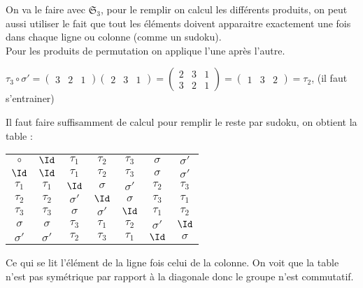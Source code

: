 \begin{ex}
On va le faire avec $\mathfrak{S}_3$, pour le remplir on calcul les différents produits, on peut aussi utiliser le fait que tout les éléments doivent apparaitre exactement une fois dans chaque ligne ou colonne (comme un sudoku).\\
Pour les produits de permutation on applique l'une après l'autre.

$\tau_3\circ\sigma'=\begin{pmatrix}
3 & 2 & 1
\end{pmatrix}\begin{pmatrix}
2 & 3 & 1 
\end{pmatrix}=\begin{pmatrix}
2 & 3 & 1\\
3 & 2 & 1 
\end{pmatrix}=\begin{pmatrix}
1 & 3 & 2 
\end{pmatrix}=\tau_2$, (il faut s'entrainer)

Il faut faire suffisamment de calcul pour remplir le reste par sudoku, on obtient la table : 
\begin{center}
\noindent\begin{tabular}{c | c c c c c c}
$\circ$ & $\Id$ & $\tau_1$ & $\tau_2$ & $\tau_3$ & $\sigma$ & $\sigma'$  \\
\cline{1-7}
$\Id$ & $\Id$ & $\tau_1$ & $\tau_2$ & $\tau_3$ & $\sigma$ & $\sigma'$ \\
$\tau_1$ &$\tau_1$ & $\Id$ & $\sigma$ & $\sigma'$ & $\tau_2$ & $\tau_3$ \\
$\tau_2$ & $\tau_2$ & $\sigma'$ & $\Id$ & $\sigma$ & $\tau_3$ & $\tau_1$ \\
$\tau_3$ & $\tau_3$ & $\sigma$ & $\sigma'$ & $\Id$ & $\tau_1$ & $\tau_2$ \\
$\sigma$ & $\sigma$ & $\tau_3$ & $\tau_1$ & $\tau_2$ & $\sigma'$ & $\Id$ \\
$\sigma'$ & $\sigma'$ & $\tau_2$ & $\tau_3$ & $\tau_1$ & $\Id$ & $\sigma$\\
\end{tabular}
\end{center}
Ce qui se lit l'élément de la ligne fois celui de la colonne. On voit que la table n'est pas symétrique par rapport à la diagonale donc le groupe n'est commutatif.
\end{ex}

